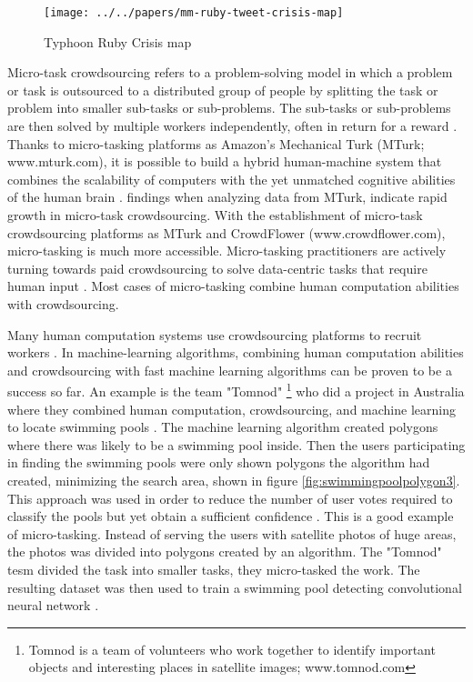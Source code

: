 \begin{figure}[H]
	\centering
	\texttt{[image: ../../papers/mm-ruby-tweet-crisis-map]}
	\caption[Crisis map \citep{Meier2014}]{Typhoon Ruby Crisis map \citep{Meier2014}}
	\label{fig:mm-ruby-tweet-crisis-map}
\end{figure}

Micro-task crowdsourcing refers to a problem-solving model in which a problem or task is outsourced to a distributed group of people by splitting the task or problem into smaller sub-tasks or sub-problems. The sub-tasks or sub-problems are then solved by multiple workers independently, often in return for a reward \citep{Sarasua2012}. Thanks to micro-tasking platforms as Amazon's Mechanical Turk (MTurk; www.mturk.com), it is possible to build a hybrid human-machine system that combines the scalability of computers with the yet unmatched cognitive abilities of the human brain \citep{Difallah2016}. \cite{Gadiraju2015} findings when analyzing data from MTurk, indicate rapid growth in micro-task crowdsourcing. With the establishment of micro-task crowdsourcing platforms as MTurk and CrowdFlower (www.crowdflower.com), micro-tasking is much more accessible. Micro-tasking practitioners are actively turning towards paid crowdsourcing to solve data-centric tasks that require human input \citep{Gadiraju2015}. Most cases of micro-tasking combine human computation abilities with crowdsourcing.

Many human computation systems use crowdsourcing platforms to recruit workers \citep{Schulze2012}. In machine-learning algorithms, combining human computation abilities and crowdsourcing with fast machine learning algorithms can be proven to be a success so far. An example is the team "Tomnod" \footnote{Tomnod is a team of volunteers who work together to identify important objects and interesting places in satellite images; www.tomnod.com} who did a project in Australia where they combined human computation, crowdsourcing, and machine learning to locate swimming pools \citep{Kostas2016}. The machine learning algorithm created polygons where there was likely to be a swimming pool inside. Then the users participating in finding the swimming pools were only shown polygons the algorithm had created, minimizing the search area, shown in figure \ref{fig:swimmingpoolpolygon3}. This approach was used in order to reduce the number of user votes required to classify the pools but yet obtain a sufficient confidence \citep{Kostas2016}. This is a good example of micro-tasking. Instead of serving the users with satellite photos of huge areas, the photos was divided into polygons created by an algorithm. The "Tomnod" tesm divided the task into smaller tasks, they micro-tasked the work. The resulting dataset was then used to train a swimming pool detecting convolutional neural network \citep{Nikki2016}.

